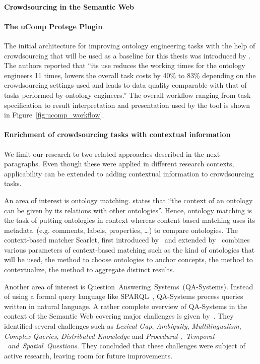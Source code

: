 \documentclass[12pt, notitlepage]{article}
\begin{document}
\paragraph{Crowdsourcing in the Semantic Web}

\paragraph{The uComp Protege Plugin}
The initial architecture for improving ontology engineering tasks with the help of crowdsourcing that will be used as a baseline for this thesis was introduced by \citet{wohlgenannt2016crowd}. The authors reported that \enquote{its use reduces the working times for the ontology engineers 11 times, lowers the overall task costs by 40\% to 83\% depending on the crowdsourcing settings used and leads to data quality comparable with that of tasks performed by ontology engineers.} The overall workflow ranging from task specification to result interpretation and presentation used by the tool is shown in Figure~\ref{fig:ucomp_workflow}.

\paragraph{Enrichment of crowdsourcing tasks with contextual information}
We limit our research to two related approaches described in the next paragraphs. Even though these were applied in different research contexts, applicability can be extended to adding contextual information to crowdsourcing tasks.

An area of interest is ontology matching. \citet{hoffmann2010context} states that \enquote{the context of an ontology can be given by its relations with other ontologies}. Hence, ontology matching is the task of putting ontologies in context whereas content based matching uses its metadata~(e.g. comments, labels, properties, \ldots) to compare ontologies. The context-based matcher Scarlet, first introduced by~\citet{sabou2008scarlet} and extended by~\citet{hoffmann2010context} combines various parameters of context-based matching such as the kind of ontologies that will be used, the method to choose ontologies to anchor concepts, the method to contextualize, the method to aggregate distinct results. 

Another area of interest is Question~Answering~Systems~(QA-Systems). Instead of using a formal query language like SPARQL~\cite{harris2013sparql}, QA-Systems process queries written in natural language. A rather complete overview of QA-Systems in the context of the Semantic Web covering major challenges is given by~\citet{hoffner2016survey}. They identified several challenges such as \emph{Lexical Gap}, \emph{Ambiguity}, \emph{Multilingualism}, \emph{Complex Queries}, \emph{Distributed Knowledge} and \emph{Procedural-,~Temporal-~and~Spatial~Questions}. They concluded that these challenges were subject of active research, leaving room for future improvements. 
\end{document}
